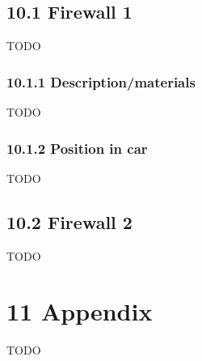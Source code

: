 \documentclass{article}
\begin{document}
\subsection*{10.1 Firewall 1}
TODO

\subsubsection*{10.1.1 Description/materials}
TODO

\subsubsection*{10.1.2 Position in car}
TODO

\subsection*{10.2 Firewall 2}
TODO

\section*{11 Appendix}
TODO
\end{document}
